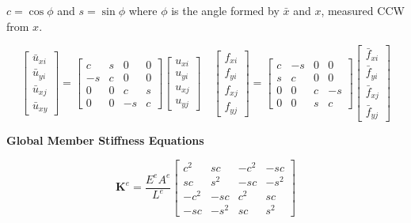 \documentclass{article}
\begin{document}
\begin{multicols*}{2}
    $c = \cos{\phi}$ and $s = \sin{\phi}$ where $\phi$ is the angle formed by
    $\bar{x}$ and $x$, measured CCW from $x$.\par 
    \begin{equation*}
        \begin{bmatrix}
            \bar{u}_{xi}\\
            \bar{u}_{yi}\\
            \bar{u}_{xj}\\
            \bar{u}_{xy}
        \end{bmatrix}
        =
        \begin{bmatrix}
            c & s & 0 & 0\\
            -s & c & 0 & 0\\
            0 & 0 & c & s\\
            0 & 0 & -s & c
        \end{bmatrix}
        \begin{bmatrix}
            u_{xi}\\
            u_{yi}\\
            u_{xj}\\
            u_{yj}
        \end{bmatrix}
        \quad
        \begin{bmatrix}
            f_{xi}\\
            f_{yi}\\
            f_{xj}\\
            f_{yj}
        \end{bmatrix}
        =
        \begin{bmatrix}
            c & -s & 0 & 0\\
            s & c & 0 & 0\\
            0 & 0 & c & -s\\
            0 & 0 & s & c
        \end{bmatrix}
        \begin{bmatrix}
            \bar{f}_{xi}\\
            \bar{f}_{yi}\\
            \bar{f}_{xj}\\
            \bar{f}_{yj}
        \end{bmatrix}
    \end{equation*}

    \textbf{Global Member Stiffness Equations}\par 
    \begin{equation*}
        \textbf{K}^e = \frac{E^eA^e}{L^e}
        \begin{bmatrix}
            c^2 & sc & -c^2 & -sc\\
            sc & s^2 & -sc & -s^2\\
            -c^2 & -sc & c^2 & sc\\
            -sc & -s^2 & sc & s^2
        \end{bmatrix}
    \end{equation*}


\end{multicols*}
\end{document}

